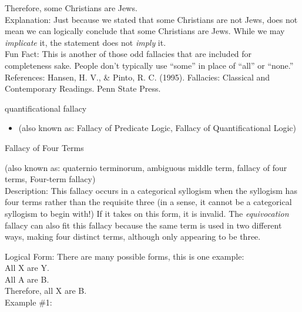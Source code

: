 \documentclass[a4paper,12pt,single,pdftex]{scrartcl}
\begin{document}
    
      Therefore, some Christians are Jews.
    \\

    
      Explanation: Just because we stated that some Christians are not  Jews, does not mean we can logically conclude that some Christians are Jews.  While we may {\it implicate} it, the statement does not {\it imply}  it.
    \\

    
      Fun Fact: This is another of those odd fallacies that are included for completeness sake. People don’t typically use “some” in place of “all” or “none.”
    \\

    References: Hansen, H. V., \& Pinto, R. C. (1995). Fallacies: Classical and Contemporary Readings. Penn State Press.
  

quantificational fallacy
    \begin{itemize}
  \item 
        (also known as: Fallacy of Predicate Logic, Fallacy of Quantificational Logic)
      
    \end{itemize}
  
  

Fallacy of Four Terms
    
      (also known as: quaternio terminorum, ambiguous middle term, fallacy of four terms, Four-term fallacy)
    \\

  
    Description: This fallacy occurs in a categorical syllogism when the syllogism has four terms rather than the requisite three (in a sense, it cannot be a categorical syllogism to begin with!)  If it takes on this form, it is invalid.  The {\it equivocation} fallacy can also fit this fallacy because the same term is used in two different ways, making four distinct terms, although only appearing to be three.

    
      Logical Form: There are many possible forms, this is one example:
    \\

    
      All X are Y.
    \\

    
      All A are B.
    \\

    
      Therefore, all X are B.
    \\

    
      Example \#1:
    \\
\end{document}
